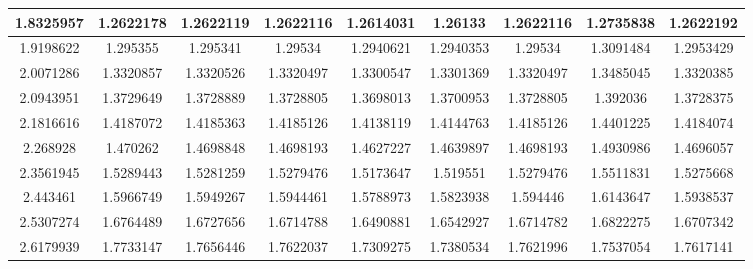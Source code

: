 \documentclass{article}
\begin{document}
\begin{landscape}
\begin{table}[]
\begin{tabular}{|c|c|c|c|c|c|c|c|c|}
	1.8325957                                                & 1.2622178     & 1.2622119     & 1.2622116      & 1.2614031    & 1.26133      & 1.2622116     & 1.2735838  & 1.2622192  \\ \hline
	1.9198622                                                & 1.295355      & 1.295341      & 1.29534        & 1.2940621    & 1.2940353    & 1.29534       & 1.3091484  & 1.2953429  \\ \hline
	2.0071286                                                & 1.3320857     & 1.3320526     & 1.3320497      & 1.3300547    & 1.3301369    & 1.3320497     & 1.3485045  & 1.3320385  \\ \hline
	2.0943951                                                & 1.3729649     & 1.3728889     & 1.3728805      & 1.3698013    & 1.3700953    & 1.3728805     & 1.392036   & 1.3728375  \\ \hline
	2.1816616                                                & 1.4187072     & 1.4185363     & 1.4185126      & 1.4138119    & 1.4144763    & 1.4185126     & 1.4401225  & 1.4184074  \\ \hline
	2.268928                                                 & 1.470262      & 1.4698848     & 1.4698193      & 1.4627227    & 1.4639897    & 1.4698193     & 1.4930986  & 1.4696057  \\ \hline
	2.3561945                                                & 1.5289443     & 1.5281259     & 1.5279476      & 1.5173647    & 1.519551     & 1.5279476     & 1.5511831  & 1.5275668  \\ \hline
	2.443461                                                 & 1.5966749     & 1.5949267     & 1.5944461      & 1.5788973    & 1.5823938    & 1.594446      & 1.6143647  & 1.5938537  \\ \hline
	2.5307274                                                & 1.6764489     & 1.6727656     & 1.6714788      & 1.6490881    & 1.6542927    & 1.6714782     & 1.6822275  & 1.6707342  \\ \hline
	2.6179939                                                & 1.7733147     & 1.7656446     & 1.7622037      & 1.7309275    & 1.7380534    & 1.7621996     & 1.7537054  & 1.7617141  \\ \hline
	\end{tabular}
	\end{table}
\end{landscape}
\end{document}
